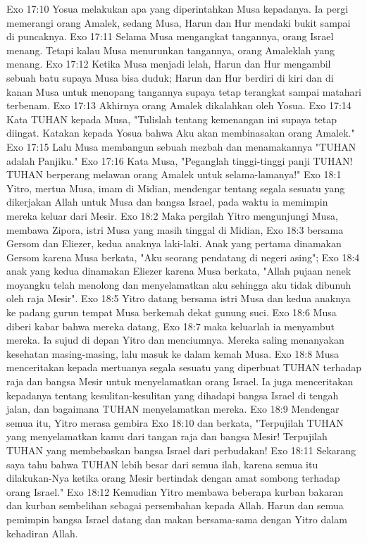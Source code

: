 Exo 17:10  Yosua melakukan apa yang diperintahkan Musa kepadanya. Ia pergi memerangi orang Amalek, sedang Musa, Harun dan Hur mendaki bukit sampai di puncaknya.
Exo 17:11  Selama Musa mengangkat tangannya, orang Israel menang. Tetapi kalau Musa menurunkan tangannya, orang Amaleklah yang menang.
Exo 17:12  Ketika Musa menjadi lelah, Harun dan Hur mengambil sebuah batu supaya Musa bisa duduk; Harun dan Hur berdiri di kiri dan di kanan Musa untuk menopang tangannya supaya tetap terangkat sampai matahari terbenam.
Exo 17:13  Akhirnya orang Amalek dikalahkan oleh Yosua.
Exo 17:14  Kata TUHAN kepada Musa, "Tulislah tentang kemenangan ini supaya tetap diingat. Katakan kepada Yosua bahwa Aku akan membinasakan orang Amalek."
Exo 17:15  Lalu Musa membangun sebuah mezbah dan menamakannya "TUHAN adalah Panjiku."
Exo 17:16  Kata Musa, "Peganglah tinggi-tinggi panji TUHAN! TUHAN berperang melawan orang Amalek untuk selama-lamanya!"
Exo 18:1  Yitro, mertua Musa, imam di Midian, mendengar tentang segala sesuatu yang dikerjakan Allah untuk Musa dan bangsa Israel, pada waktu ia memimpin mereka keluar dari Mesir.
Exo 18:2  Maka pergilah Yitro mengunjungi Musa, membawa Zipora, istri Musa yang masih tinggal di Midian,
Exo 18:3  bersama Gersom dan Eliezer, kedua anaknya laki-laki. Anak yang pertama dinamakan Gersom karena Musa berkata, "Aku seorang pendatang di negeri asing";
Exo 18:4  anak yang kedua dinamakan Eliezer karena Musa berkata, "Allah pujaan nenek moyangku telah menolong dan menyelamatkan aku sehingga aku tidak dibunuh oleh raja Mesir".
Exo 18:5  Yitro datang bersama istri Musa dan kedua anaknya ke padang gurun tempat Musa berkemah dekat gunung suci.
Exo 18:6  Musa diberi kabar bahwa mereka datang,
Exo 18:7  maka keluarlah ia menyambut mereka. Ia sujud di depan Yitro dan menciumnya. Mereka saling menanyakan kesehatan masing-masing, lalu masuk ke dalam kemah Musa.
Exo 18:8  Musa menceritakan kepada mertuanya segala sesuatu yang diperbuat TUHAN terhadap raja dan bangsa Mesir untuk menyelamatkan orang Israel. Ia juga menceritakan kepadanya tentang kesulitan-kesulitan yang dihadapi bangsa Israel di tengah jalan, dan bagaimana TUHAN menyelamatkan mereka.
Exo 18:9  Mendengar semua itu, Yitro merasa gembira
Exo 18:10  dan berkata, "Terpujilah TUHAN yang menyelamatkan kamu dari tangan raja dan bangsa Mesir! Terpujilah TUHAN yang membebaskan bangsa Israel dari perbudakan!
Exo 18:11  Sekarang saya tahu bahwa TUHAN lebih besar dari semua ilah, karena semua itu dilakukan-Nya ketika orang Mesir bertindak dengan amat sombong terhadap orang Israel."
Exo 18:12  Kemudian Yitro membawa beberapa kurban bakaran dan kurban sembelihan sebagai persembahan kepada Allah. Harun dan semua pemimpin bangsa Israel datang dan makan bersama-sama dengan Yitro dalam kehadiran Allah.
